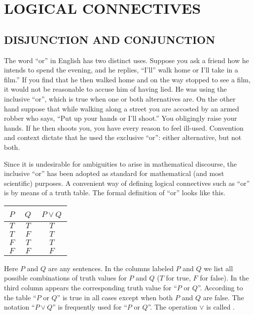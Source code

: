 \chapter{LOGICAL CONNECTIVES}\label{log_con}

\section{DISJUNCTION AND CONJUNCTION}\label{d_and_c} The word ``or'' in English has two
distinct uses.  Suppose you ask a friend how he intends to spend the evening, and he replies,
``I'll'' walk home or I'll take in a film.'' If you find that he then walked home and on the
way stopped to see a film, it would not be reasonable to accuse him of having lied. He was
using the inclusive ``or'', which is true when one or both alternatives are. On the other hand
suppose that while walking along a street you are accosted by an armed robber who says, ``Put
up your hands or I'll shoot.''  You obligingly raise your hands. If he then shoots you, you
have every reason to feel ill-used. Convention and context dictate that he used the  exclusive
``or'': either alternative, but not both.

Since it is undesirable for ambiguities to arise in mathematical discourse, the inclusive
``or'' has been adopted as standard for mathematical (and most scientific) purposes. A
convenient way of defining logical connectives such as ``or'' is by means of a truth table.
The formal definition of ``or'' looks like this.
 \begin{center}
  \begin{tabular}{|c|c||c|}\hline
        \,$P$\,    &    \,$Q$\,    &   \,$P \lor Q$\,   \\
    \hline\hline
          $T$      &      $T$      &     $T$            \\
    \hline
          $T$      &      $F$      &     $T$            \\
    \hline
          $F$      &      $T$      &     $T$            \\
    \hline
          $F$      &      $F$      &     $F$            \\
    \hline
  \end{tabular}
 \end{center}
Here $P$ and $Q$ are any sentences. In the columns labeled $P$ and $Q$ we list all possible
combinations of truth values for $P$ and $Q$ ($T$ for true, $F$ for false). In the third
column appears the corresponding truth value for ``$P$ or $Q$''. According to the table ``$P$
or $Q$'' is true in all cases except when both $P$ and $Q$ are false. The notation
``$P \lor Q$'' is frequently used for ``$P$ or $Q$''.  The
operation $\lor$ is called
.

